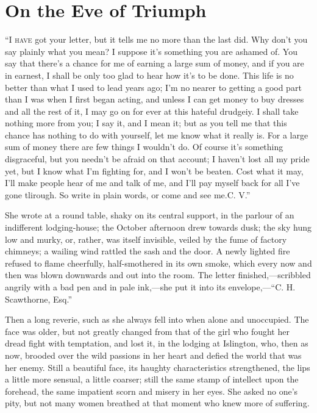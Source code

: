 \chapter{On the Eve of Triumph}

\textsc{``I have} got your letter, but it tells me no more than the last
did. Why don't you say plainly what you mean? I suppose it's something
you are ashamed of. You say that there's a chance for me of earning a
large sum of money, and if you are in earnest, I shall be only too glad
to hear how it's to be done. This life is no better than what I used to
lead years ago; I'm no nearer to getting a good part than I was when I
first began acting, and unless I can get money to buy dresses and all
the rest of it, I may go on for ever at this hateful drudgeiy. I shall
take nothing more from you; I say it, and I mean it; but as you tell me
that this chance has nothing to do with yourself, let me know what it
really is. For a large sum of money {}there are few things I wouldn't
do. Of course it's something disgraceful, but you needn't be afraid on
that account; I haven't lost all my pride yet, but I know what I'm
fighting for, and I won't be beaten. Cost what it may, I'll make people
hear of me and talk of me, and I'll pay myself back for all I've gone
tlirough. So write in plain words, or come and see me.{C. V.''}

She wrote at a round table, shaky on its central support, in the parlour
of an indifferent lodging-house; the October afternoon drew towards
dusk; the sky hung low and murky, or, rather, was itself invisible,
veiled by the fume of factory chimneys; a wailing wind rattled the sash
and the door. A newly lighted fire refused to flame cheerfully,
half-smothered in its own smoke, which every now and then was blown
downwards and out into the room. The letter finished,---scribbled
angrily with a bad pen and in pale ink,---she put it into its
envelope,---``C. H. Scawthorne, Esq.''

{}Then a long reverie, such as she always fell into when alone and
unoccupied. The face was older, but not greatly changed from that of the
girl who fought her dread fight with temptation, and lost it, in the
lodging at Islington, who, then as now, brooded over the wild passions
in her heart and defied the world that was her enemy. Still a beautiful
face, its haughty characteristics strengthened, the lips a little more
sensual, a little coarser; still the same stamp of intellect upon the
forehead, the same impatient scorn and misery in her eyes. She asked no
one's pity, but not many women breathed at that moment who knew more of
suffering.

